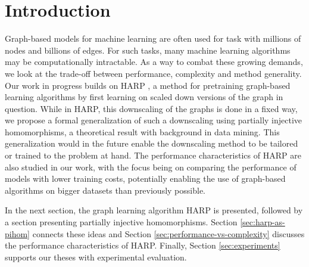 \section{Introduction}

Graph-based models for machine learning are often used for task with millions of nodes and billions of edges. For such tasks, many machine learning algorithms may be computationally intractable. As a way to combat these growing demands, we look at the trade-off between performance, complexity and method generality. Our work in progress builds on HARP \cite{chen_harp_2018}, a method for pretraining graph-based learning algorithms by first learning on scaled down versions of the graph in question. While in HARP, this downscaling of the graphs is done in a fixed way, we propose a formal generalization of such a downscaling using partially injective homomorphisms, a theoretical result with background in data mining. This generalization would in the future enable the downscaling method to be tailored or trained to the problem at hand. The performance characteristics of HARP are also studied in our work, with the focus being on comparing the performance of models with lower training costs, potentially enabling the use of graph-based algorithms on bigger datasets than previously possible.

In the next section, the graph learning algorithm HARP is presented, followed by a section presenting partially injective homomorphisms. Section \ref{sec:harp-as-pihom} connects these ideas and Section \ref{sec:performance-vs-complexity} discusses the performance characteristics of HARP. Finally, Section \ref{sec:experiments} supports our theses with experimental evaluation.
